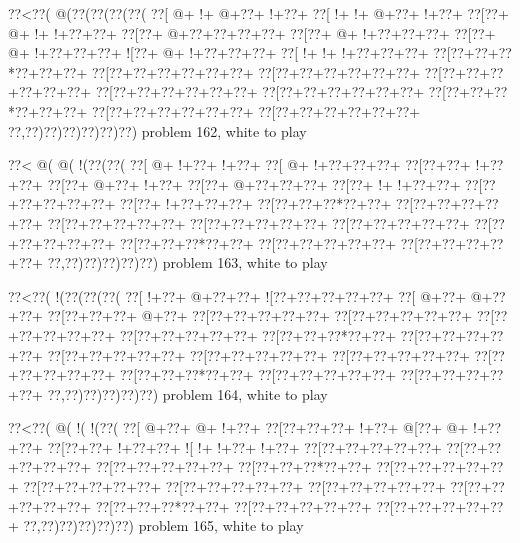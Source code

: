 \vbox{\vbox{\goo
\0??<\0??(\- @(\0??(\0??(\0??(\0??(
\0??[\- @+\- !+\- @+\0??+\- !+\0??+
\0??[\- !+\- !+\- @+\0??+\- !+\0??+
\0??[\0??+\- @+\- !+\- !+\0??+\0??+
\0??[\0??+\- @+\0??+\0??+\0??+\0??+
\0??[\0??+\- @+\- !+\0??+\0??+\0??+
\0??[\0??+\- @+\- !+\0??+\0??+\0??+
\- ![\0??+\- @+\- !+\0??+\0??+\0??+
\0??[\- !+\- !+\- !+\0??+\0??+\0??+
\0??[\0??+\0??+\0??*\0??+\0??+\0??+
\0??[\0??+\0??+\0??+\0??+\0??+\0??+
\0??[\0??+\0??+\0??+\0??+\0??+\0??+
\0??[\0??+\0??+\0??+\0??+\0??+\0??+
\0??[\0??+\0??+\0??+\0??+\0??+\0??+
\0??[\0??+\0??+\0??+\0??+\0??+\0??+
\0??[\0??+\0??+\0??*\0??+\0??+\0??+
\0??[\0??+\0??+\0??+\0??+\0??+\0??+
\0??[\0??+\0??+\0??+\0??+\0??+\0??+
\0??,\0??)\0??)\0??)\0??)\0??)\0??)
}
\hfil problem 162, white to play\hfil\break
}

\vbox{\vbox{\goo
\0??<\- @(\- @(\- !(\0??(\0??(
\0??[\- @+\- !+\0??+\- !+\0??+
\0??[\- @+\- !+\0??+\0??+\0??+
\0??[\0??+\0??+\- !+\0??+\0??+
\0??[\0??+\- @+\0??+\- !+\0??+
\0??[\0??+\- @+\0??+\0??+\0??+
\0??[\0??+\- !+\- !+\0??+\0??+
\0??[\0??+\0??+\0??+\0??+\0??+
\0??[\0??+\- !+\0??+\0??+\0??+
\0??[\0??+\0??+\0??*\0??+\0??+
\0??[\0??+\0??+\0??+\0??+\0??+
\0??[\0??+\0??+\0??+\0??+\0??+
\0??[\0??+\0??+\0??+\0??+\0??+
\0??[\0??+\0??+\0??+\0??+\0??+
\0??[\0??+\0??+\0??+\0??+\0??+
\0??[\0??+\0??+\0??*\0??+\0??+
\0??[\0??+\0??+\0??+\0??+\0??+
\0??[\0??+\0??+\0??+\0??+\0??+
\0??,\0??)\0??)\0??)\0??)\0??)
}
\hfil problem 163, white to play\hfil\break
}

\vbox{\vbox{\goo
\0??<\0??(\- !(\0??(\0??(\0??(
\0??[\- !+\0??+\- @+\0??+\0??+
\- ![\0??+\0??+\0??+\0??+\0??+
\0??[\- @+\0??+\- @+\0??+\0??+
\0??[\0??+\0??+\0??+\- @+\0??+
\0??[\0??+\0??+\0??+\0??+\0??+
\0??[\0??+\0??+\0??+\0??+\0??+
\0??[\0??+\0??+\0??+\0??+\0??+
\0??[\0??+\0??+\0??+\0??+\0??+
\0??[\0??+\0??+\0??*\0??+\0??+
\0??[\0??+\0??+\0??+\0??+\0??+
\0??[\0??+\0??+\0??+\0??+\0??+
\0??[\0??+\0??+\0??+\0??+\0??+
\0??[\0??+\0??+\0??+\0??+\0??+
\0??[\0??+\0??+\0??+\0??+\0??+
\0??[\0??+\0??+\0??*\0??+\0??+
\0??[\0??+\0??+\0??+\0??+\0??+
\0??[\0??+\0??+\0??+\0??+\0??+
\0??,\0??)\0??)\0??)\0??)\0??)
}
\hfil problem 164, white to play\hfil\break
}

\vbox{\vbox{\goo
\0??<\0??(\- @(\- !(\- !(\0??(
\0??[\- @+\0??+\- @+\- !+\0??+
\0??[\0??+\0??+\0??+\- !+\0??+
\- @[\0??+\- @+\- !+\0??+\0??+
\0??[\0??+\0??+\- !+\0??+\0??+
\- ![\- !+\- !+\0??+\- !+\0??+
\0??[\0??+\0??+\0??+\0??+\0??+
\0??[\0??+\0??+\0??+\0??+\0??+
\0??[\0??+\0??+\0??+\0??+\0??+
\0??[\0??+\0??+\0??*\0??+\0??+
\0??[\0??+\0??+\0??+\0??+\0??+
\0??[\0??+\0??+\0??+\0??+\0??+
\0??[\0??+\0??+\0??+\0??+\0??+
\0??[\0??+\0??+\0??+\0??+\0??+
\0??[\0??+\0??+\0??+\0??+\0??+
\0??[\0??+\0??+\0??*\0??+\0??+
\0??[\0??+\0??+\0??+\0??+\0??+
\0??[\0??+\0??+\0??+\0??+\0??+
\0??,\0??)\0??)\0??)\0??)\0??)
}
\hfil problem 165, white to play\hfil\break
}

